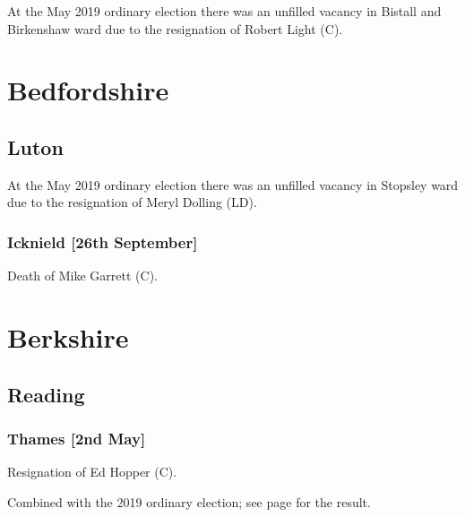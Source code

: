 \documentclass[a4paper,openany]{book}
\begin{document}
\begin{resultsiii}
At the May 2019 ordinary election there was an unfilled vacancy in Bistall and Birkenshaw ward due to the resignation of Robert Light (C).

\section{Bedfordshire}

\subsection*{Luton}

At the May 2019 ordinary election there was an unfilled vacancy in Stopsley ward due to the resignation of Meryl Dolling (LD).

\subsubsection*{Icknield \hspace*{\fill}\nolinebreak[1]%
	\enspace\hspace*{\fill}
	[26th September]}


Death of Mike Garrett (C).

\section{Berkshire}

\subsection*{Reading}

\subsubsection*{Thames \hspace*{\fill}\nolinebreak[1]%
	\enspace\hspace*{\fill}
	[2nd May]}


Resignation of Ed Hopper (C).

Combined with the 2019 ordinary election; see page \pageref{ThamesReading} for the result.


\end{resultsiii}
\end{document}

